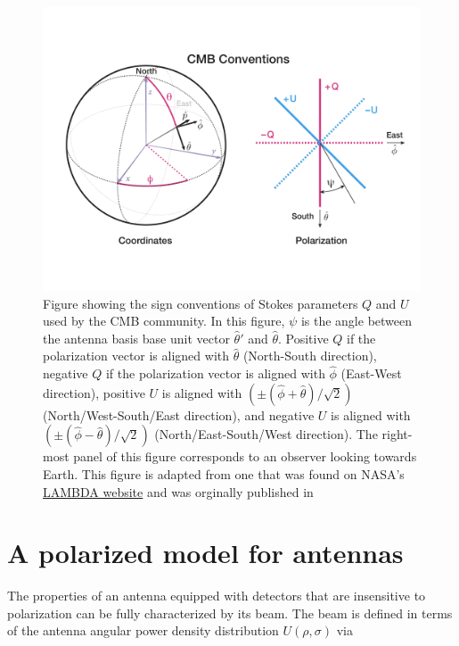 \documentclass[a4paper,11pt]{article}
\begin{document}
\begin{figure}
	\centering
	\includegraphics[width=1.0\linewidth]{figures/cmb_coord_convention}
	\caption{Figure showing the sign conventions of Stokes parameters $Q$ and $U$ used by the CMB community. In this figure, $\psi$ is the angle between the antenna basis base unit vector $\hat{\theta}'$ and $\hat{\theta}$. Positive $Q$ if the polarization vector is aligned with $\hat{\theta}$ (North-South direction), negative $Q$ if the polarization vector is aligned with $\hat{\phi}$ (East-West direction), positive $U$ is aligned with $(\pm(\hat{\phi} + \hat{\theta})/\sqrt{2} )$ (North/West-South/East direction), and negative $U$ is aligned with $(\pm(\hat{\phi} - \hat{\theta})/\sqrt{2} )$ (North/East-South/West direction). The right-most panel of this figure corresponds to an observer looking towards Earth.  This figure is adapted from one that was found on NASA's \href{https://lambda.gsfc.nasa.gov/product/about/pol_convention.cfm}{LAMBDA website} and was orginally published in \cite{1999astro.ph..5275G}}
	\label{fig::cmbcoordconvention}
\end{figure}

\section{A polarized model for antennas}
\label{sec::antennas}

The properties of an antenna equipped with detectors that are insensitive to polarization can be fully characterized by its beam. The beam is defined in terms of the antenna angular power density distribution $U(\rho,\sigma)$ via
\end{document}
